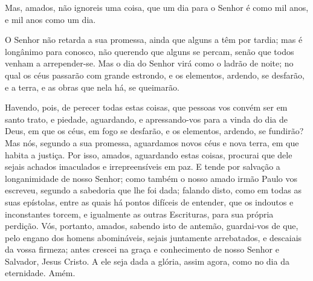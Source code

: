 Mas, amados, não ignoreis uma coisa, que um dia para o Senhor é
como mil anos, e mil anos como um dia.

O Senhor não retarda a sua promessa, ainda que alguns a têm por
tardia; mas é longânimo para conosco, não querendo que alguns se
percam, senão que todos venham a arrepender-se. Mas o dia do
Senhor virá como o ladrão de noite; no qual os céus passarão com
grande estrondo, e os elementos, ardendo, se desfarão, e a terra, e
as obras que nela há, se queimarão.

Havendo, pois, de perecer todas estas coisas, que pessoas vos
convém ser em santo trato, e piedade, aguardando, e
apressando-vos para a vinda do dia de Deus, em que os céus, em fogo
se desfarão, e os elementos, ardendo, se fundirão? Mas nós,
segundo a sua promessa, aguardamos novos céus e nova terra, em que
habita a justiça. Por isso, amados, aguardando estas coisas,
procurai que dele sejais achados imaculados e irrepreensíveis em
paz. E tende por salvação a longanimidade de nosso Senhor;
como também o nosso amado irmão Paulo vos escreveu, segundo a
sabedoria que lhe foi dada; falando disto, como em todas as
suas epístolas, entre as quais há pontos difíceis de entender, que
os indoutos e inconstantes torcem, e igualmente as outras
Escrituras, para sua própria perdição. Vós, portanto, amados,
sabendo isto de antemão, guardai-vos de que, pelo engano dos homens
abomináveis, sejais juntamente arrebatados, e descaiais da vossa
firmeza; antes crescei na graça e conhecimento de nosso
Senhor e Salvador, Jesus Cristo. A ele seja dada a glória, assim
agora, como no dia da eternidade. Amém.


